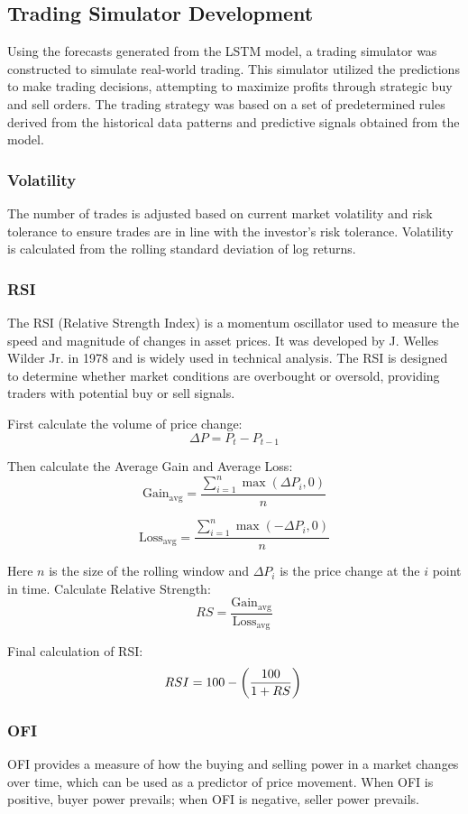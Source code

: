 \documentclass[conference]{IEEEtran}
\begin{document}
\subsection{Trading Simulator Development}
Using the forecasts generated from the LSTM model, a trading simulator was constructed to simulate real-world trading. This simulator utilized the predictions to make trading decisions, attempting to maximize profits through strategic buy and sell orders. The trading strategy was based on a set of predetermined rules derived from the historical data patterns and predictive signals obtained from the model.

\subsubsection{Volatility}
The number of trades is adjusted based on current market volatility and risk tolerance to ensure trades are in line with the investor's risk tolerance.
Volatility is calculated from the rolling standard deviation of log returns.

\subsubsection{RSI}
The RSI (Relative Strength Index) is a momentum oscillator used to measure the speed and magnitude of changes in asset prices. It was developed by J. Welles Wilder Jr. in 1978 and is widely used in technical analysis. The RSI is designed to determine whether market conditions are overbought or oversold, providing traders with potential buy or sell signals\cite{RSI-MACD}.

First calculate the volume of price change:\[\Delta P = P_t - P_{t-1}\]

Then calculate the Average Gain and Average Loss:\[\text{Gain}_{\text{avg}} = \frac{\sum_{i=1}^{n} \max(\Delta P_i, 0)}{n}\]

\[\text{Loss}_{\text{avg}} = \frac{\sum_{i=1}^{n} \max(-\Delta P_i, 0)}{n}\]

Here \(n\) is the size of the rolling window and \(\Delta P_i\) is the price change at the \(i\) point in time.
Calculate Relative Strength:\[RS = \frac{\text{Gain}_{\text{avg}}}{\text{Loss}_{\text{avg}}}\]

Final calculation of RSI:\[RSI = 100 - \left(\frac{100}{1 + RS}\right)\\\]


\subsubsection{OFI}
OFI provides a measure of how the buying and selling power in a market changes over time, which can be used as a predictor of price movement. When OFI is positive, buyer power prevails; when OFI is negative, seller power prevails\cite{OFI}.
\end{document}
